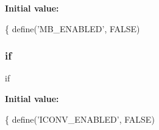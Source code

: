 {\bfseries Initial value\+:}
\begin{DoxyCode}
\{
        define(\textcolor{stringliteral}{'MB\_ENABLED'}, FALSE)
\end{DoxyCode}
\mbox{\label{_code_igniter_8php_a565ae1002e1468af84434f86276c519e}} 
\subsubsection{\texorpdfstring{if}{if}}
{\footnotesize\ttfamily if}

{\bfseries Initial value\+:}
\begin{DoxyCode}
\{
        define(\textcolor{stringliteral}{'ICONV\_ENABLED'}, FALSE)
\end{DoxyCode}
